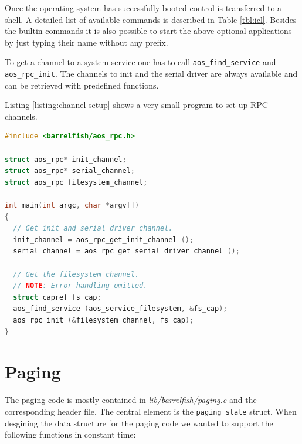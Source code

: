\documentclass[a4paper,10pt]{article}
\newcommand{\filepath}[1]{\emph{ #1}}
\begin{document}
Once the operating system has successfully booted control is transferred to a shell.
A detailed list of available commands is described in Table \ref{tbl:icl}.
Besides the builtin commands it is also possible to start the above optional applications by just typing their name without any prefix.

To get a channel to a system service one has to call \lstinline!aos_find_service! and \lstinline!aos_rpc_init!.
The channels to init and the serial driver are always available and can be retrieved with predefined functions.

Listing \ref{listing:channel-setup} shows a very small program to set up RPC channels.

\begin{lstlisting}[language=C, caption={Setup code for channels.}, captionpos=b, label=listing:channel-setup]
#include <barrelfish/aos_rpc.h>

struct aos_rpc* init_channel;
struct aos_rpc* serial_channel;
struct aos_rpc filesystem_channel;

int main(int argc, char *argv[])
{
  // Get init and serial driver channel.
  init_channel = aos_rpc_get_init_channel ();
  serial_channel = aos_rpc_get_serial_driver_channel ();
  
  // Get the filesystem channel.
  // NOTE: Error handling omitted.
  struct capref fs_cap;
  aos_find_service (aos_service_filesystem, &fs_cap);
  aos_rpc_init (&filesystem_channel, fs_cap);
}
\end{lstlisting}

\section{Paging}

% 
% 
% 

The paging code is mostly contained in \filepath{lib/barrelfish/paging.c} and the corresponding header file.
The central element is the \lstinline!paging_state! struct.
When desgining the data structure for the paging code we wanted to support the following functions in constant time:
\end{document}

